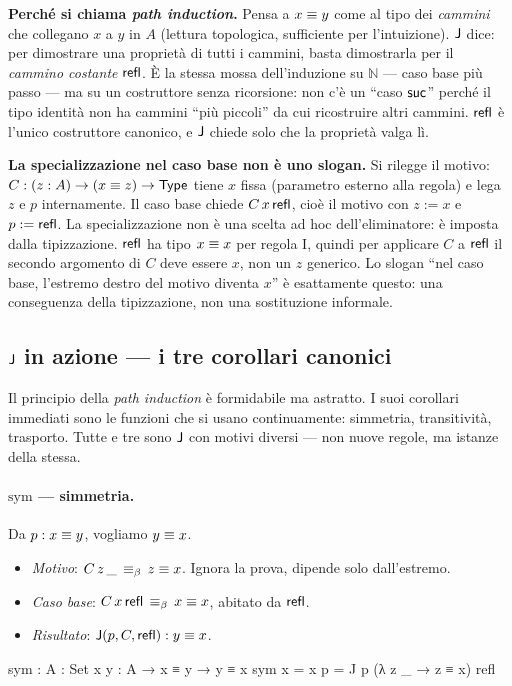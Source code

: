 \medskip

\noindent\textbf{Perch\'e si chiama \emph{path induction}.} Pensa a $x \equiv y$ come al tipo dei \emph{cammini} che collegano $x$ a $y$ in $A$ (lettura topologica, sufficiente per l'intuizione). $\mathsf{J}$ dice: per dimostrare una propriet\`a di tutti i cammini, basta dimostrarla per il \emph{cammino costante} $\mathsf{refl}$. \`E la stessa mossa dell'induzione su $\mathbb{N}$ --- caso base pi\`u passo --- ma su un costruttore senza ricorsione: non c'\`e un ``caso $\mathsf{suc}$'' perch\'e il tipo identit\`a non ha cammini ``pi\`u piccoli'' da cui ricostruire altri cammini. $\mathsf{refl}$ \`e l'unico costruttore canonico, e $\mathsf{J}$ chiede solo che la propriet\`a valga l\`i.

\medskip

\noindent\textbf{La specializzazione nel caso base non \`e uno slogan.} Si rilegge il motivo: $C : (z : A) \to (x \equiv z) \to \mathsf{Type}$ tiene $x$ fissa (parametro esterno alla regola) e lega $z$ e $p$ internamente. Il caso base chiede $C\,x\,\mathsf{refl}$, cio\`e il motivo con $z := x$ e $p := \mathsf{refl}$. La specializzazione non \`e una scelta ad hoc dell'eliminatore: \`e imposta dalla tipizzazione. $\mathsf{refl}$ ha tipo $x \equiv x$ per regola I, quindi per applicare $C$ a $\mathsf{refl}$ il secondo argomento di $C$ deve essere $x$, non un $z$ generico. Lo slogan ``nel caso base, l'estremo destro del motivo diventa $x$'' \`e esattamente questo: una conseguenza della tipizzazione, non una sostituzione informale.

\subsection*{$\mathsf{J}$ in azione --- i tre corollari canonici}

Il principio della \emph{path induction} \`e formidabile ma astratto. I suoi corollari immediati sono le funzioni che si usano continuamente: simmetria, transitivit\`a, trasporto. Tutte e tre sono $\mathsf{J}$ con motivi diversi --- non nuove regole, ma istanze della stessa.

\paragraph{$\mathrm{sym}$ --- simmetria.} Da $p : x \equiv y$, vogliamo $y \equiv x$.
\begin{itemize}
\item \emph{Motivo}: $C\,z\,\_ \,\equiv_{\beta}\, z \equiv x$. Ignora la prova, dipende solo dall'estremo.
\item \emph{Caso base}: $C\,x\,\mathsf{refl} \,\equiv_{\beta}\, x \equiv x$, abitato da $\mathsf{refl}$.
\item \emph{Risultato}: $\mathsf{J}(p, C, \mathsf{refl}) : y \equiv x$.
\end{itemize}
\begin{agda}
sym : {A : Set} {x y : A} → x ≡ y → y ≡ x
sym {x = x} p = J p (λ z _ → z ≡ x) refl
\end{agda}

